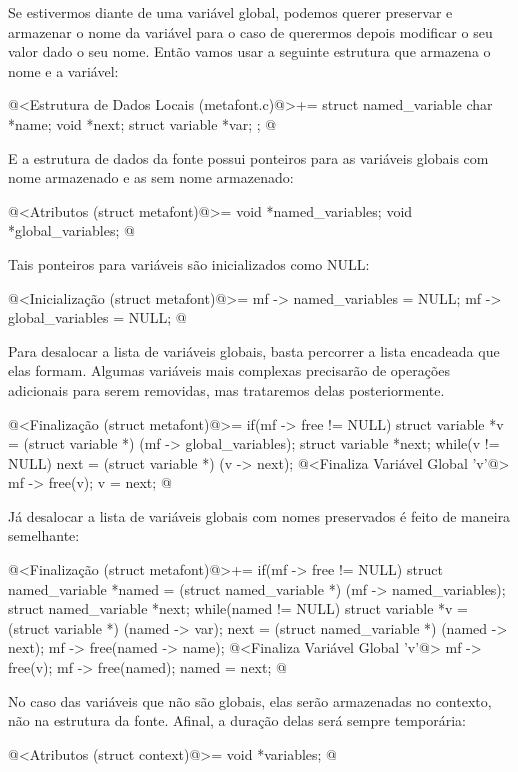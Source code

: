 Se estivermos diante de uma variável global, podemos querer preservar
e armazenar o nome da variável para o caso de querermos depois
modificar o seu valor dado o seu nome. Então vamos usar a seguinte
estrutura que armazena o nome e a variável:

\iniciocodigo
@<Estrutura de Dados Locais (metafont.c)@>+=
struct named_variable{
  char *name;
  void *next;
  struct variable *var;
};
@
\fimcodigo

E a estrutura de dados da fonte possui ponteiros para as variáveis
globais com nome armazenado e as sem nome armazenado:

\iniciocodigo
@<Atributos (struct metafont)@>=
  void *named_variables;
  void *global_variables;
@
\fimcodigo

Tais ponteiros para variáveis são inicializados como NULL:

\iniciocodigo
@<Inicialização (struct metafont)@>=
mf -> named_variables = NULL;
mf -> global_variables = NULL;
@
\fimcodigo

Para desalocar a lista de variáveis globais, basta percorrer a lista
encadeada que elas formam. Algumas variáveis mais complexas precisarão
de operações adicionais para serem removidas, mas trataremos delas
posteriormente.

\iniciocodigo
@<Finalização (struct metafont)@>=
if(mf -> free != NULL){
  struct variable *v = (struct variable *) (mf -> global_variables);
  struct variable *next;
  while(v != NULL){
    next = (struct variable *) (v -> next);
    @<Finaliza Variável Global 'v'@>
    mf -> free(v);
    v = next;
  }
}
@
\fimcodigo

Já desalocar a lista de variáveis globais com nomes preservados é
feito de maneira semelhante:

\iniciocodigo
@<Finalização (struct metafont)@>+=
if(mf -> free != NULL){
  struct named_variable *named = (struct named_variable *)
                                   (mf -> named_variables);
  struct named_variable *next;
  while(named != NULL){
    struct variable *v = (struct variable *) (named -> var);
    next = (struct named_variable *) (named -> next);
    mf -> free(named -> name);
    @<Finaliza Variável Global 'v'@>
    mf -> free(v);
    mf -> free(named);
    named = next;
  }
}
@
\fimcodigo

No caso das variáveis que não são globais, elas serão armazenadas no
contexto, não na estrutura da fonte. Afinal, a duração delas será
sempre temporária:

\iniciocodigo
@<Atributos (struct context)@>=
  void *variables;
@
\fimcodigo


